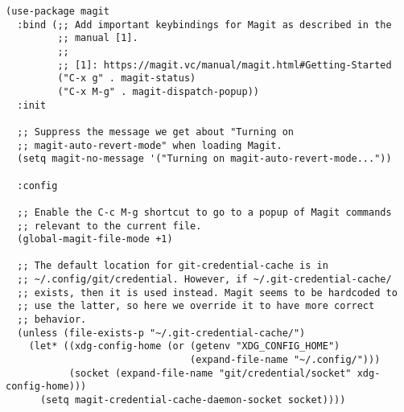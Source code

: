 \documentclass[11pt]{article}
\begin{document}
\begin{verbatim}
(use-package magit
  :bind (;; Add important keybindings for Magit as described in the
         ;; manual [1].
         ;;
         ;; [1]: https://magit.vc/manual/magit.html#Getting-Started
         ("C-x g" . magit-status)
         ("C-x M-g" . magit-dispatch-popup))
  :init

  ;; Suppress the message we get about "Turning on
  ;; magit-auto-revert-mode" when loading Magit.
  (setq magit-no-message '("Turning on magit-auto-revert-mode..."))

  :config

  ;; Enable the C-c M-g shortcut to go to a popup of Magit commands
  ;; relevant to the current file.
  (global-magit-file-mode +1)

  ;; The default location for git-credential-cache is in
  ;; ~/.config/git/credential. However, if ~/.git-credential-cache/
  ;; exists, then it is used instead. Magit seems to be hardcoded to
  ;; use the latter, so here we override it to have more correct
  ;; behavior.
  (unless (file-exists-p "~/.git-credential-cache/")
    (let* ((xdg-config-home (or (getenv "XDG_CONFIG_HOME")
                                (expand-file-name "~/.config/")))
           (socket (expand-file-name "git/credential/socket" xdg-config-home)))
      (setq magit-credential-cache-daemon-socket socket))))

\end{verbatim}
\end{document}
